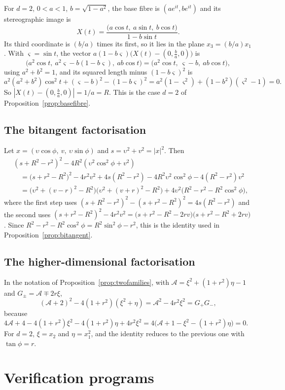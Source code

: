 \documentclass[11pt]{amsart}
\numberwithin{equation}{section}
\theoremstyle{plain}
\theoremstyle{definition}
\theoremstyle{remark}
\begin{document}
For $d=2$, $0<a<1$, $b=\sqrt{1-a^2}$, the base fibre is $(ae^{it},be^{it})$ and its stereographic image is
\[
X(t)=\frac{\bigl(a\cos t,\ a\sin t,\ b\cos t\bigr)}{1-b\sin t}.
\]
Its third coordinate is $(b/a)$ times its first, so it lies in the plane $x_3=(b/a)x_1$. With $\varsigma=\sin t$, the vector $a(1-b\varsigma)\bigl(X(t)-(0,\tfrac ba,0)\bigr)$ is
\[
\bigl(a^2\cos t,\ a^2\varsigma-b(1-b\varsigma),\ ab\cos t\bigr)=\bigl(a^2\cos t,\ \varsigma-b,\ ab\cos t\bigr),
\]
using $a^2+b^2=1$, and its squared length minus $(1-b\varsigma)^2$ is
\[
a^2(a^2+b^2)\cos^2t+(\varsigma-b)^2-(1-b\varsigma)^2=a^2(1-\varsigma^2)+(1-b^2)(\varsigma^2-1)=0 .
\]
So $|X(t)-(0,\tfrac ba,0)|=1/a=R$. This is the case $d=2$ of Proposition~\ref{prop:basefibre}.

\subsection{The bitangent factorisation}

Let $x=(\upsilon\cos\phi,\ v,\ \upsilon\sin\phi)$ and $s=\upsilon^2+v^2=|x|^2$. Then
\begin{align*}
&(s+R^2-r^2)^2-4R^2(\upsilon^2\cos^2\phi+v^2)\\
&\quad=\bigl(s+r^2-R^2\bigr)^2-4r^2v^2+4s(R^2-r^2)-4R^2\upsilon^2\cos^2\phi-4(R^2-r^2)v^2\\
&\quad=\bigl(\upsilon^2+(v-r)^2-R^2\bigr)\bigl(\upsilon^2+(v+r)^2-R^2\bigr)+4\upsilon^2\bigl(R^2-r^2-R^2\cos^2\phi\bigr),
\end{align*}
where the first step uses $(s+R^2-r^2)^2-(s+r^2-R^2)^2=4s(R^2-r^2)$ and the second uses $(s+r^2-R^2)^2-4r^2v^2=\bigl(s+r^2-R^2-2rv\bigr)\bigl(s+r^2-R^2+2rv\bigr)$. Since $R^2-r^2-R^2\cos^2\phi=R^2\sin^2\phi-r^2$, this is the identity used in Proposition~\ref{prop:bitangent}.

\subsection{The higher-dimensional factorisation}

In the notation of Proposition~\ref{prop:twofamilies}, with $\mathcal A=\xi^2+(1+r^2)\eta-1$ and $G_\pm=\mathcal A\mp2r\xi$,
\[
(\mathcal A+2)^2-4(1+r^2)(\xi^2+\eta)=\mathcal A^2-4r^2\xi^2=G_+G_-,
\]
because $4\mathcal A+4-4(1+r^2)\xi^2-4(1+r^2)\eta+4r^2\xi^2=4\bigl(\mathcal A+1-\xi^2-(1+r^2)\eta\bigr)=0$. For $d=2$, $\xi=x_2$ and $\eta=x_1^2$, and the identity reduces to the previous one with $\tan\phi=r$.

\section{Verification programs}\label{app:checks}
\end{document}
